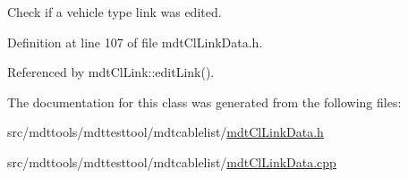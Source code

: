 Check if a vehicle type link was edited. 



Definition at line 107 of file mdt\-Cl\-Link\-Data.\-h.



Referenced by mdt\-Cl\-Link\-::edit\-Link().



The documentation for this class was generated from the following files\-:\begin{DoxyCompactItemize}
\item 
src/mdttools/mdttesttool/mdtcablelist/\hyperlink{mdt_cl_link_data_8h}{mdt\-Cl\-Link\-Data.\-h}\item 
src/mdttools/mdttesttool/mdtcablelist/\hyperlink{mdt_cl_link_data_8cpp}{mdt\-Cl\-Link\-Data.\-cpp}\end{DoxyCompactItemize}
